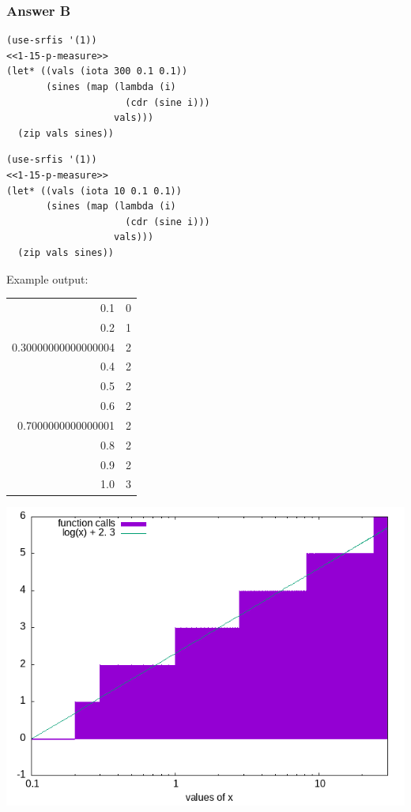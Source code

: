 \documentclass[final,fleqn,titlepage,twoside]{article}
\begin{document}
\subsubsection{Answer B}
\label{sec:org59d443d}
\begin{verbatim}
(use-srfis '(1))
<<1-15-p-measure>>
(let* ((vals (iota 300 0.1 0.1))
       (sines (map (lambda (i)
                     (cdr (sine i)))
                   vals)))
  (zip vals sines))
\end{verbatim}
\begin{verbatim}
(use-srfis '(1))
<<1-15-p-measure>>
(let* ((vals (iota 10 0.1 0.1))
       (sines (map (lambda (i)
                     (cdr (sine i)))
                   vals)))
  (zip vals sines))
\end{verbatim}

Example output:
\begin{center}
\begin{tabular}{rr}
0.1 & 0\\[0pt]
0.2 & 1\\[0pt]
0.30000000000000004 & 2\\[0pt]
0.4 & 2\\[0pt]
0.5 & 2\\[0pt]
0.6 & 2\\[0pt]
0.7000000000000001 & 2\\[0pt]
0.8 & 2\\[0pt]
0.9 & 2\\[0pt]
1.0 & 3\\[0pt]
\end{tabular}
\end{center}

\begin{center}
\includegraphics[width=.9\linewidth]{1/fig/1-15-step.png}
\end{center}
\end{document}

